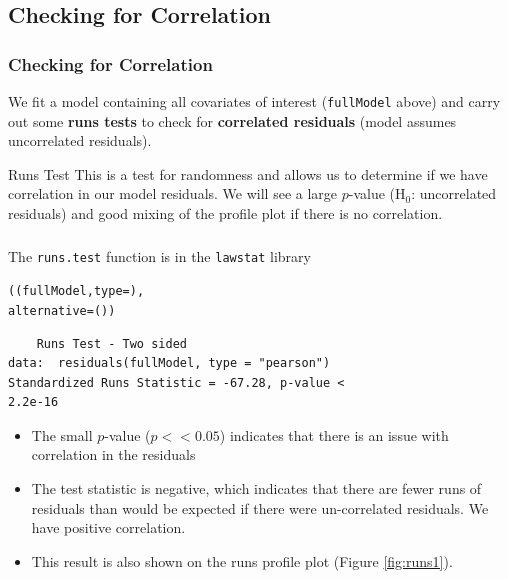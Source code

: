 \subsection{Checking for Correlation}

\begin{frame}[fragile]
\frametitle{Checking for Correlation}
We fit a model containing all covariates of interest ({\tt fullModel} above) and carry out some \textbf{runs tests} to check for \textbf{correlated residuals} (model assumes uncorrelated residuals).

\begin{block}{Runs Test}
This is a test for randomness and allows us to determine if we have correlation in our model residuals. We will see a large $p$-value (H$_0$: uncorrelated residuals) and good mixing of the profile plot if there is no correlation.
\end{block}

\end{frame}

\begin{frame}[fragile]
\frametitle{}
\noindent The {\tt runs.test} function is in the {\tt lawstat} library
\begin{knitrout}\footnotesize
{}\color{fgcolor}\begin{kframe}
\begin{alltt}
((fullModel, type = ), 
alternative = ())
\end{alltt}
\begin{verbatim}
	Runs Test - Two sided
data:  residuals(fullModel, type = "pearson") 
Standardized Runs Statistic = -67.28, p-value <
2.2e-16
\end{verbatim}
\end{kframe}
\end{knitrout}

\begin{itemize}
\item The small $p$-value ($p << 0.05$) indicates that there is an issue with correlation in the residuals
\item The test statistic is negative, which indicates that there are fewer runs of residuals than would be expected if there were un-correlated residuals.  We have positive correlation.
\item This result is also shown on the runs profile plot (Figure \ref{fig:runs1}).
\end{itemize}
\end{frame}

